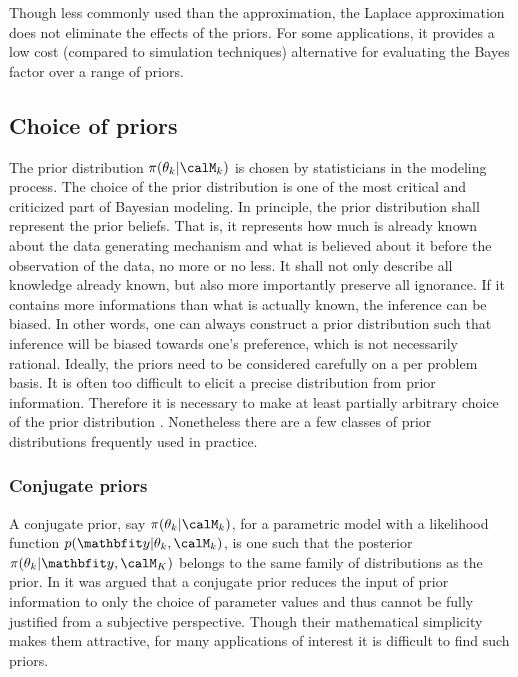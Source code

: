 Though less commonly used than the \bic approximation, the Laplace
approximation does not eliminate the effects of the priors. For some
applications, it provides a low cost (compared to simulation techniques)
alternative for evaluating the Bayes factor over a range of priors.

\subsection{Choice of priors}
\label{sub:Choice of priors}

The prior distribution $\pi(\theta_k|\calM_k)$ is chosen by statisticians in
the modeling process. The choice of the prior distribution is one of the most
critical and criticized part of Bayesian modeling. In principle, the prior
distribution shall represent the prior beliefs. That is, it represents how
much is already known about the data generating mechanism and what is
believed about it before the observation of the data, no more or no less. It
shall not only describe all knowledge already known, but also more
importantly preserve all ignorance. If it contains more informations than
what is actually known, the inference can be biased. In other words, one can
always construct a prior distribution such that inference will be biased
towards one's preference, which is not necessarily rational. Ideally, the
priors need to be considered carefully on a per problem basis. It is often
too difficult to elicit a precise distribution from prior information.
Therefore it is necessary to make at least partially arbitrary choice of the
prior distribution \cite[][chap.~3]{Robert:2007tc}\cite{Kass:1995vb}.
Nonetheless there are a few classes of prior distributions frequently used in
practice.

\subsubsection{Conjugate priors}
\label{ssub:Conjugate priors}

A conjugate prior, say $\pi(\theta_k|\calM_k)$, for a parametric model with a
likelihood function $p(\data|\theta_k,\calM_k)$, is one such that the
posterior $\pi(\theta_k|\data,\calM_K)$ belongs to the same family of
distributions as the prior. In \cite[][sec.~5.2]{Bernardo:1994vd} it was
argued that a conjugate prior reduces the input of prior information to only
the choice of parameter values and thus cannot be fully justified from a
subjective perspective. Though their mathematical simplicity makes them
attractive, for many applications of interest it is difficult to find such
priors.

